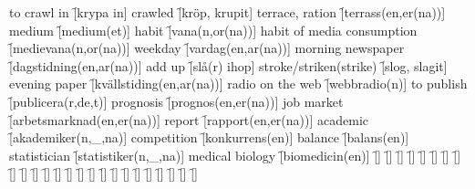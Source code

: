\begin{questions}
\begin{multicols}{2}
        \question to crawl in \f[krypa in]
        \question crawled \f[kröp, krupit]
        \question terrace, ration \f[terrass(en,er(na))]
        \question medium \f[medium(et)]
        \question habit \f[vana(n,or(na))]
        \question habit of media consumption \f[medievana(n,or(na))]
        \question weekday \f[vardag(en,ar(na))]
        \question morning newspaper \f[dagstidning(en,ar(na))]
        \question add up \f[slå(r) ihop]
        \question stroke/striken(strike) \f[slog, slagit]
        \question evening paper \f[kvällstiding(en,ar(na))]
        \question radio on the web \f[webbradio(n)]
        \question to publish \f[publicera(r,de,t)]
        \question prognosis \f[prognos(en,er(na))]
        \question job market \f[arbetsmarknad(en,er(na))]
        \question report \f[rapport(en,er(na))]
        \question academic \f[akademiker(n,\_,na)]
        \question competition \f[konkurrens(en)]
        \question balance \f[balans(en)]
        \question statistician \f[statistiker(n,\_,na)]
        \question medical biology \f[biomedicin(en)]
        \question  \f[]
        \question  \f[]
        \question  \f[]
        \question  \f[]
        \question  \f[]
        \question  \f[]
        \question  \f[]
        \question  \f[]
        \question  \f[]
        \question  \f[]
        \question  \f[]
        \question  \f[]
        \question  \f[]
        \question  \f[]
        \question  \f[]
        \question  \f[]
        \question  \f[]
        \question  \f[]
        \question  \f[]
        \question  \f[]
        \question  \f[]
        \question  \f[]
        \question  \f[]
        \question  \f[]
        \question  \f[]
    \end{multicols}
\end{questions}
